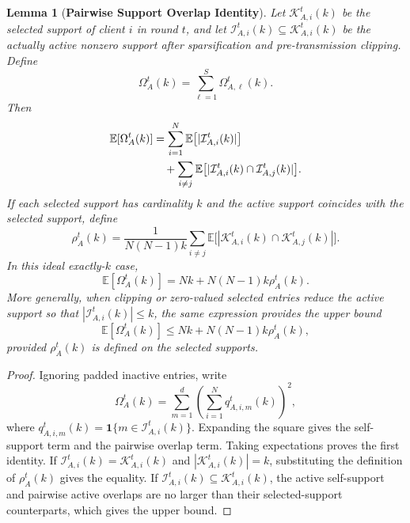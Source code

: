 \documentclass[journal]{IEEEtran}
\newtheorem{lemma}{Lemma}
\begin{document}
\begin{lemma}[\bf Pairwise Support Overlap Identity]
    \label{lemma:overlap}
    Let $\mathcal{K}_{A,i}^t(k)$ be the selected support of client $i$ in round $t$, and let $\mathcal{I}_{A,i}^t(k)\subseteq\mathcal{K}_{A,i}^t(k)$ be the actually active nonzero support after sparsification and pre-transmission clipping. Define
    \begin{equation}
        \Omega_A^t(k)=\sum_{\ell=1}^{S}\Omega_{A,\ell}^t(k).
    \end{equation}
    Then
    \begin{align}
        \mathbb{E}[\Omega_A^t(k)]
        &=\sum_{i=1}^{N}\mathbb{E}\big[|\mathcal{I}_{A,i}^t(k)|\big]
        \notag\\
        &\quad+
        \sum_{i\neq j}\mathbb{E}\big[|\mathcal{I}_{A,i}^t(k)\cap\mathcal{I}_{A,j}^t(k)|\big].
    \end{align}
    If each selected support has cardinality $k$ and the active support coincides with the selected support, define
    \begin{equation}
        \rho_A^t(k)
        =\frac{1}{N(N-1)k}
        \sum_{i\neq j}\mathbb{E}\big[|\mathcal{K}_{A,i}^t(k)\cap\mathcal{K}_{A,j}^t(k)|\big].
    \end{equation}
    In this ideal exactly-$k$ case,
    \begin{equation}
        \mathbb{E}[\Omega_A^t(k)]
        =Nk+N(N-1)k\rho_A^t(k).
    \end{equation}
    More generally, when clipping or zero-valued selected entries reduce the active support so that $|\mathcal{I}_{A,i}^t(k)|\le k$, the same expression provides the upper bound
    \begin{equation}
        \mathbb{E}[\Omega_A^t(k)]
        \le Nk+N(N-1)k\rho_A^t(k),
    \end{equation}
    provided $\rho_A^t(k)$ is defined on the selected supports.
\end{lemma}
\begin{proof}
    Ignoring padded inactive entries, write
    \begin{equation}
        \Omega_A^t(k)=\sum_{m=1}^{d}\left(\sum_{i=1}^{N}q_{A,i,m}^t(k)\right)^2,
    \end{equation}
    where $q_{A,i,m}^t(k)=\mathbf{1}\{m\in\mathcal{I}_{A,i}^t(k)\}$. Expanding the square gives the self-support term and the pairwise overlap term. Taking expectations proves the first identity. If $\mathcal{I}_{A,i}^t(k)=\mathcal{K}_{A,i}^t(k)$ and $|\mathcal{K}_{A,i}^t(k)|=k$, substituting the definition of $\rho_A^t(k)$ gives the equality. If $\mathcal{I}_{A,i}^t(k)\subseteq\mathcal{K}_{A,i}^t(k)$, the active self-support and pairwise active overlaps are no larger than their selected-support counterparts, which gives the upper bound.
\end{proof}
\end{document}
